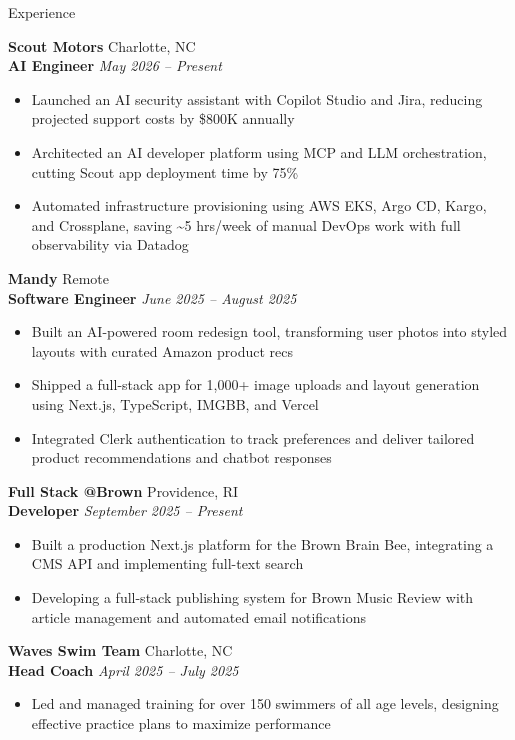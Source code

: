 \documentclass[10pt]{czresume}
\begin{document}
\begin{rSection}{Experience}

\textbf{Scout Motors} \hfill {Charlotte, NC}\\
\textbf{AI Engineer} \hfill {\em May 2026 -- Present}
\begin{itemize}
    \item Launched an AI security assistant with Copilot Studio and Jira, reducing projected support costs by \$800K annually
    \item Architected an AI developer platform using MCP and LLM orchestration, cutting Scout app deployment time by 75\%
    \item Automated infrastructure provisioning using AWS EKS, Argo CD, Kargo, and Crossplane, saving \textasciitilde5 hrs/week of manual DevOps work with full observability via Datadog
\end{itemize}
\vspace{0.5em}

\textbf{Mandy} \hfill {Remote}\\
\textbf{Software Engineer} \hfill {\em June 2025 -- August 2025}
\begin{itemize}
    \item Built an AI-powered room redesign tool, transforming user photos into styled layouts with curated Amazon product recs
    \item Shipped a full-stack app for 1,000+ image uploads and layout generation using Next.js, TypeScript, IMGBB, and Vercel
    \item Integrated Clerk authentication to track preferences and deliver tailored product recommendations and chatbot responses
\end{itemize}
\vspace{0.5em}

\textbf{Full Stack @Brown} \hfill {Providence, RI}\\
\textbf{Developer} \hfill {\em September 2025 -- Present}
\begin{itemize}
    \item Built a production Next.js platform for the Brown Brain Bee, integrating a CMS API and implementing full-text search
    \item Developing a full-stack publishing system for Brown Music Review with article management and automated email notifications
\end{itemize}
\vspace{0.5em}

\textbf{Waves Swim Team} \hfill {Charlotte, NC}\\
\textbf{Head Coach} \hfill {\em April 2025 -- July 2025}
\begin{itemize}
    \item Led and managed training for over 150 swimmers of all age levels, designing effective practice plans to maximize performance
\end{itemize}

\end{rSection}
\end{document}
